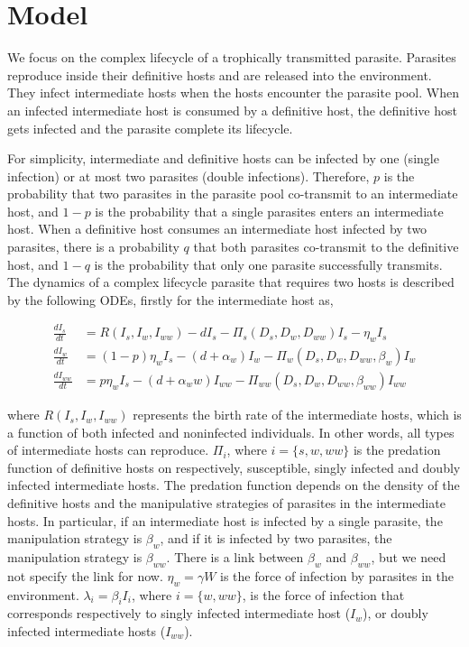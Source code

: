 \documentclass{article}
\begin{document}
\section{Model}
We focus on the complex lifecycle of a trophically transmitted parasite. 
Parasites reproduce inside their definitive hosts and are released into the environment. 
They infect intermediate hosts when the hosts encounter the parasite pool. 
When an infected intermediate host is consumed by a definitive host, the definitive host gets infected and the parasite complete its lifecycle.

For simplicity, intermediate and definitive hosts can be infected by one (single infection) or at most two parasites (double infections). 
Therefore, $p$ is the probability that two parasites in the parasite pool co-transmit to an intermediate host, and $1-p$ is the probability that a single parasites enters an intermediate host. 
When a definitive host consumes an intermediate host infected by two parasites, there is a probability $q$ that both parasites co-transmit to the definitive host, and $1-q$ is the probability that only one parasite successfully transmits. 
The dynamics of a complex lifecycle parasite that requires two hosts is described by the following ODEs, firstly for the intermediate host as,

\begin{align}
\frac{dI_s}{dt} &= R(I_s, I_w, I_{ww}) - d I_s - \Pi_s(D_s, D_w, D_{ww}) I_s  - \eta_w  I_s \nonumber \\ 
\frac{dI_w}{dt} &=  (1 - p) \eta_w I_s  - (d + \alpha_w) I_w - \Pi_w(D_s, D_w, D_{ww}, \beta_w) I_w \label{odes:ihosts} \\
\frac{dI_{ww}}{dt} &= p \eta_w I_s  - (d + \alpha_ww) I_{ww} - \Pi_{ww}(D_s, D_w, D_{ww}, \beta_{ww}) I_{ww} \nonumber
\end{align}

where  $R(I_s, I_w, I_{ww})$ represents the birth rate of the intermediate hosts, which is a function of both infected and noninfected individuals. 
In other words, all types of intermediate hosts can reproduce. 
$\Pi_i$, where $i = \{s, w, ww\}$ is the predation function of definitive hosts on respectively, susceptible, singly infected and doubly infected intermediate hosts. 
The predation function depends on the density of the definitive hosts and the manipulative strategies of parasites in the intermediate hosts. 
In particular, if an intermediate host is infected by a single parasite, the manipulation strategy is $\beta_w$, and if it is infected by two parasites, the manipulation strategy is $\beta_{ww}$. 
There is a link between $\beta_w$ and $\beta_{ww}$, but we need not specify the link for now. 
$\eta_w = \gamma W$ is the force of infection by parasites in the environment. 
$\lambda_i = \beta_i I_i$, where $i = \{ w, ww\}$, is the force of infection that corresponds respectively to singly infected intermediate host ($I_w$), or doubly infected intermediate hosts ($I_{ww}$). 
\end{document}
